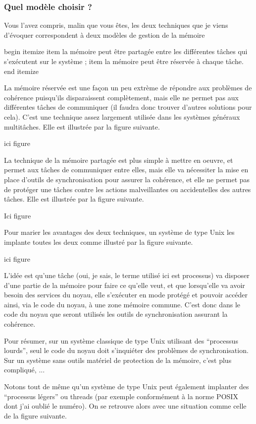 \subsubsection{Quel modèle choisir ?}

   Vous l'avez compris, malin que vous êtes, les deux techniques que
je viens d'évoquer correspondent à deux modèles de gestion de la
mémoire

begin itemize
   item la mémoire peut être partagée entre les différentes tâches
   qui s'exécutent sur le système ;
   item la mémoire peut être réservée à chaque tâche.
end itemize

   La mémoire réservée est une façon un peu extrème de répondre aux
problèmes de cohérence puisqu'ils disparaissent complètement, mais
elle ne permet pas aux différentes tâches de communiquer (il faudra
donc trouver d'autres solutions pour cela).
   C'est une technique assez largement utilisée dans les systèmes
   généraux multitâches. Elle est illustrée par la figure suivante.

   ici figure

   La technique de la mémoire partagée est plus simple à mettre en
oeuvre, et permet aux tâches de communiquer entre elles, mais elle va
nécessiter la mise en place d'outils de synchronisation pour assurer
la cohérence, et elle ne permet pas de protéger une tâches contre les
actions malveillantes ou accidentelles des autres tâches. Elle est
illustrée par la figure suivante.

   Ici figure

   Pour marier les avantages des deux techniques, un système de type
Unix les implante toutes les deux comme illustré par la figure
suivante.

ici figure

   L'idée est qu'une tâche (oui, je sais, le terme utilisé ici est
processus) va disposer d'une partie de la mémoire pour faire ce
qu'elle veut, et que lorsqu'elle va avoir besoin des services du
noyau, elle s'exécuter en mode protégé et pouvoir accéder ainsi, via
le code du noyau, à une zone mémoire commune. C'est donc dans le code
du noyau que seront utilisés les outils de synchronisation assurant la
cohérence.

   Pour résumer, sur un système classique de type Unix utilisant des
``processus lourds'', seul le code du noyau doit s'inquiéter des
problèmes de synchronisation. Sur un système sans outils matériel de
protection de la mémoire, c'est plus compliqué, ...

   Notons tout de même qu'un système de type Unix peut également
implanter des ``processus légers'' ou threads (par exemple
conformément à la norme POSIX dont j'ai oublié le numéro). On se
retrouve alors avec une situation comme celle de la figure suivante.

